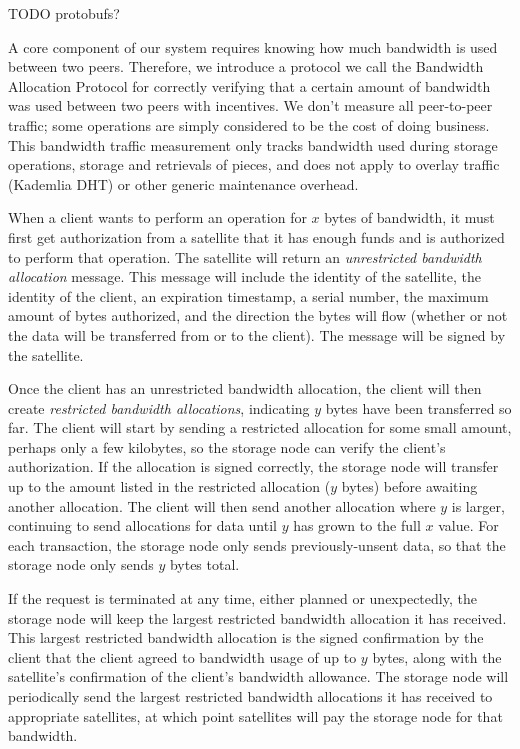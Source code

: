 \documentclass[11pt,fleqn,openany]{book}
\newcommand{\todo}[1]{{\color{red} TODO #1 }}
\begin{document}
\todo{protobufs?}

A core component of our system requires knowing how much bandwidth is used
between two peers. Therefore, we introduce a protocol we call the Bandwidth Allocation
Protocol for correctly verifying that a certain amount of bandwidth was used
between two peers with incentives.
We don't measure all peer-to-peer traffic;
some operations are simply considered to be
the cost of doing business. This bandwidth traffic measurement only tracks
bandwidth used during storage operations, storage and retrievals of pieces,
and does not apply to overlay traffic (Kademlia DHT) or other generic
maintenance overhead.

When a client wants to perform an operation for $x$ bytes of bandwidth, it must
first get authorization from a satellite
that it has enough funds and is authorized to perform that operation.
The satellite will return an {\em unrestricted
bandwidth allocation} message. This message will include the identity of the
satellite, the identity of the client, an expiration timestamp, a serial number,
the maximum amount of bytes authorized, and the direction the bytes will flow
(whether or not the data will be transferred from or to the client).
The message will be signed by the satellite.


Once the client has an unrestricted bandwidth allocation, the client will then
create {\em restricted bandwidth allocations},
indicating $y$ bytes have been transferred so far. The client
will start by sending a restricted allocation for some small amount,
perhaps only a few kilobytes,
so the storage node can verify the client's authorization.
If the allocation is signed correctly, the storage node will
transfer up to the amount listed in the restricted allocation ($y$ bytes) before
awaiting another allocation. The client will then send another allocation where
$y$ is larger, continuing to send allocations for data until $y$ has grown to
the full $x$ value.
For each transaction, the storage node only sends previously-unsent data,
so that the storage node only sends $y$ bytes total.

If the request is terminated at any time,
either planned or unexpectedly,
the storage node will keep the largest restricted bandwidth allocation it has
received.
This largest restricted bandwidth allocation is the signed confirmation
by the client that the client agreed to bandwidth usage of up to $y$
bytes, along with the satellite's confirmation of the client's bandwidth
allowance.
The storage node will periodically send the largest restricted bandwidth
allocations it has received to appropriate satellites, at which point
satellites will pay the storage node for that bandwidth.
\end{document}
